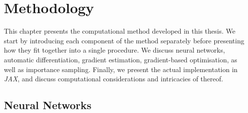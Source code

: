 \ifpdf
\graphicspath{{Chapter4/Figs/Raster/}{Chapter4/Figs/PDF/}{Chapter4/Figs/}}
\else
\graphicspath{{Chapter4/Figs/Vector/}{Chapter4/Figs/}}
\fi



\chapter{Methodology}
\label{chapter4}
This chapter presents the computational method developed in this thesis. We start by introducing each component of the method separately before presenting how they fit together into a single procedure. We discuss neural networks, automatic differentiation, gradient estimation, gradient-based optimisation, as well as importance sampling. Finally, we present the actual implementation in \emph{JAX}, and discuss computational considerations and intricacies of thereof.

\section{Neural Networks} %
